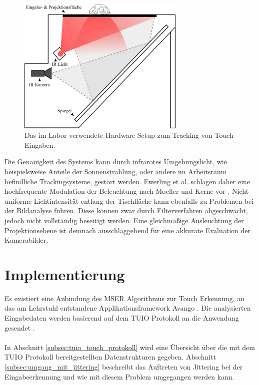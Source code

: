 \begin{figure}
	\begin{center}
		\includegraphics[width=8cm]{img/table_setup.pdf}
	\end{center}
	\caption{Das im Labor verwendete Hardware Setup zum Tracking von Touch Eingaben.}
	\label{fig:table_setup}
\end{figure}

Die Genauigkeit des Systems kann durch infrarotes Umgebungslicht, wie beispielsweise Anteile der Sonnenstrahlung, oder andere im Arbeitsraum befindliche Trackingsysteme, gestört werden. Ewerling et al. schlagen daher eine hochfrequente Modulation der Beleuchtung nach Moeller und Kerne vor \cite{ewerling:2012, moeller:2012}.  Nicht-uniforme Lichtintensität entlang der Tischfläche kann ebenfalls zu Problemen bei der Bildanalyse führen. Diese können zwar durch Filterverfahren abgeschwächt, jedoch nicht vollständig beseitigt werden. Eine gleichmäßige Ausleuchtung der Projektionsebene ist demnach ausschlaggebend für eine akkurate Evaluation der Kamerabilder.


\section{Implementierung}
\label{sec:implementierung_mser}
Es existiert eine Anbindung des MSER Algorithmus zur Touch Erkennung, an das am Lehrstuhl entstandene Applikationsframework Avango \cite{avango:2011}. Die analysierten Eingabedaten werden basierend auf dem TUIO Protokoll an die Anwendung gesendet \cite{tuio}.
\\\\
In Abschnitt \ref{subsec:tuio_touch_protokoll} wird eine Übersicht über die mit dem TUIO Protokoll bereitgestellten Datenstrukturen gegeben. Abschnitt \ref{subsec:umgang_mit_jittering} beschreibt das Auftreten von Jittering bei der Eingabeerkennung und wie mit diesem Problem umgegangen werden kann.


